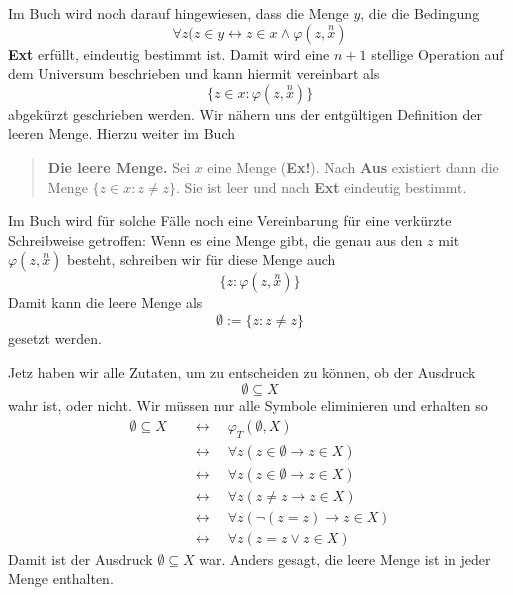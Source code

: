 \documentclass[11pt, a4paper]{article}
\begin{document}
\noindent
Im Buch wird noch darauf hingewiesen, dass die Menge $y$, die die Bedingung
\[
\forall z(z\in y \leftrightarrow z\in x\land \varphi(z, \overset{n}{x})
\]
\textbf{Ext}
erfüllt, eindeutig bestimmt ist. Damit wird eine $n+1$ stellige Operation auf
dem Universum beschrieben und kann hiermit vereinbart als
\[
    \{z\in x: \varphi(z, \overset{n}{x})\}
\]
abgekürzt geschrieben werden. Wir nähern uns der entgültigen Definition der
leeren Menge. Hierzu weiter im Buch

\begin{quote}
    \textbf{Die leere Menge.} Sei $x$ eine Menge (\textbf{Ex!}). Nach
    \textbf{Aus} existiert dann die Menge $\{z\in x: z\neq z\}$. Sie ist leer
    und nach \textbf{Ext} eindeutig bestimmt.
\end{quote}

Im Buch wird für solche Fälle noch eine Vereinbarung für eine verkürzte
Schreibweise getroffen: Wenn es eine Menge gibt, die genau aus den $z$ mit
$\varphi(z, \overset{n}{x})$ besteht, schreiben wir für diese Menge auch
\[
    \{z:\varphi(z,\overset{n}{x})\}
\]
Damit kann die leere Menge als
\[
    \emptyset:=\{z:z\neq z\}
\]
gesetzt werden.

Jetz haben wir alle Zutaten, um zu entscheiden zu können, ob der
Ausdruck
\[
    \emptyset \subseteq X
\]
wahr ist, oder nicht. Wir müssen nur alle Symbole eliminieren und erhalten so
\begin{equation}
\begin{split}
    \emptyset \subseteq X & \quad \leftrightarrow\quad \varphi_T(\emptyset, X) \\ 
     & \quad\leftrightarrow\quad\forall z(z\in \emptyset \rightarrow z\in X) \\
     & \quad\leftrightarrow\quad\forall z(z\in \emptyset \rightarrow z\in X) \\
     & \quad\leftrightarrow\quad\forall z(z\neq z \rightarrow z\in X) \\
     & \quad\leftrightarrow\quad\forall z(\lnot(z=z) \rightarrow z\in X) \\
     & \quad\leftrightarrow\quad\forall z(z=z \lor z\in X)
\end{split}
\end{equation}
Damit ist der Ausdruck $\emptyset\subseteq X$ war. Anders gesagt, die leere Menge
ist in jeder Menge enthalten.
\end{document}
